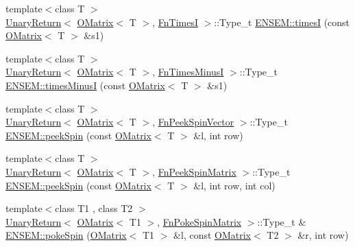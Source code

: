 \begin{DoxyCompactItemize}
{\footnotesize template$<$class T $>$ }\\\mbox{\hyperlink{structENSEM_1_1UnaryReturn}{Unary\+Return}}$<$ \mbox{\hyperlink{classENSEM_1_1OMatrix}{O\+Matrix}}$<$ T $>$, \mbox{\hyperlink{structENSEM_1_1FnTimesI}{Fn\+TimesI}} $>$\+::Type\+\_\+t \mbox{\hyperlink{group__obsmatrix_ga988cbbcb7d182905bfc7bf8cda7543cf}{E\+N\+S\+E\+M\+::timesI}} (const \mbox{\hyperlink{classENSEM_1_1OMatrix}{O\+Matrix}}$<$ T $>$ \&s1)
\item 
{\footnotesize template$<$class T $>$ }\\\mbox{\hyperlink{structENSEM_1_1UnaryReturn}{Unary\+Return}}$<$ \mbox{\hyperlink{classENSEM_1_1OMatrix}{O\+Matrix}}$<$ T $>$, \mbox{\hyperlink{structENSEM_1_1FnTimesMinusI}{Fn\+Times\+MinusI}} $>$\+::Type\+\_\+t \mbox{\hyperlink{group__obsmatrix_ga2c4879d53ca01a4233b94574e3c93b4f}{E\+N\+S\+E\+M\+::times\+MinusI}} (const \mbox{\hyperlink{classENSEM_1_1OMatrix}{O\+Matrix}}$<$ T $>$ \&s1)
\item 
{\footnotesize template$<$class T $>$ }\\\mbox{\hyperlink{structENSEM_1_1UnaryReturn}{Unary\+Return}}$<$ \mbox{\hyperlink{classENSEM_1_1OMatrix}{O\+Matrix}}$<$ T $>$, \mbox{\hyperlink{structENSEM_1_1FnPeekSpinVector}{Fn\+Peek\+Spin\+Vector}} $>$\+::Type\+\_\+t \mbox{\hyperlink{group__obsmatrix_ga4d21a5274ec8135eea719a150bed1f7a}{E\+N\+S\+E\+M\+::peek\+Spin}} (const \mbox{\hyperlink{classENSEM_1_1OMatrix}{O\+Matrix}}$<$ T $>$ \&l, int row)
\item 
{\footnotesize template$<$class T $>$ }\\\mbox{\hyperlink{structENSEM_1_1UnaryReturn}{Unary\+Return}}$<$ \mbox{\hyperlink{classENSEM_1_1OMatrix}{O\+Matrix}}$<$ T $>$, \mbox{\hyperlink{structENSEM_1_1FnPeekSpinMatrix}{Fn\+Peek\+Spin\+Matrix}} $>$\+::Type\+\_\+t \mbox{\hyperlink{group__obsmatrix_ga5d47056fa4fb3fad4e48957e55c3cdec}{E\+N\+S\+E\+M\+::peek\+Spin}} (const \mbox{\hyperlink{classENSEM_1_1OMatrix}{O\+Matrix}}$<$ T $>$ \&l, int row, int col)
\item 
{\footnotesize template$<$class T1 , class T2 $>$ }\\\mbox{\hyperlink{structENSEM_1_1UnaryReturn}{Unary\+Return}}$<$ \mbox{\hyperlink{classENSEM_1_1OMatrix}{O\+Matrix}}$<$ T1 $>$, \mbox{\hyperlink{structENSEM_1_1FnPokeSpinMatrix}{Fn\+Poke\+Spin\+Matrix}} $>$\+::Type\+\_\+t \& \mbox{\hyperlink{group__obsmatrix_ga45420280324408e59bcbaca0ead5aa55}{E\+N\+S\+E\+M\+::poke\+Spin}} (\mbox{\hyperlink{classENSEM_1_1OMatrix}{O\+Matrix}}$<$ T1 $>$ \&l, const \mbox{\hyperlink{classENSEM_1_1OMatrix}{O\+Matrix}}$<$ T2 $>$ \&r, int row)

\end{DoxyCompactItemize}

